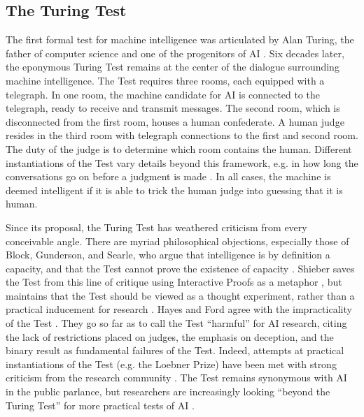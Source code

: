 \subsection{The Turing Test}

The first formal test for machine intelligence was articulated by Alan Turing, the father of computer science and one of the progenitors of AI \citep{turing1950computing}. Six decades later, the eponymous Turing Test remains at the center of the dialogue surrounding machine intelligence. The Test requires three rooms, each equipped with a telegraph. In one room, the machine candidate for AI is connected to the telegraph, ready to receive and transmit messages. The second room, which is disconnected from the first room, houses a human confederate. A human judge resides in the third room with telegraph connections to the first and second room. The duty of the judge is to determine which room contains the human. Different instantiations of the Test vary details beyond this framework, e.g. in how long the conversations go on before a judgment is made \citep{loebner2003home, bishop2010testing}. In all cases, the machine is deemed intelligent if it is able to trick the human judge into guessing that it is human.

Since its proposal, the Turing Test has weathered criticism from every conceivable angle. There are myriad philosophical objections, especially those of Block, Gunderson, and Searle, who argue that intelligence is by definition a capacity, and that the Test cannot prove the existence of capacity \citep{block1980intuitions, gunderson1964vii, searle1980minds}. Shieber saves the Test from this line of critique using Interactive Proofs as a metaphor \citep{shieber2007turing}, but maintains that the Test should be viewed as a thought experiment, rather than a practical inducement for research \citep{shieber2015}. Hayes and Ford agree with the impracticality of the Test \citep{hayes1995turing}. They go so far as to call the Test ``harmful'' for AI research, citing the lack of restrictions placed on judges, the emphasis on deception, and the binary result as fundamental failures of the Test. Indeed, attempts at practical instantiations of the Test (e.g. the Loebner Prize) have been met with strong criticism from the research community \citep{shieber1994lessons, occasional_pamphlet_2014}. The Test remains synonymous with AI in the public parlance, but researchers are increasingly looking ``beyond the Turing Test'' for more practical tests of AI \citep{1_the_newyorker_2015, you2015beyond}.

